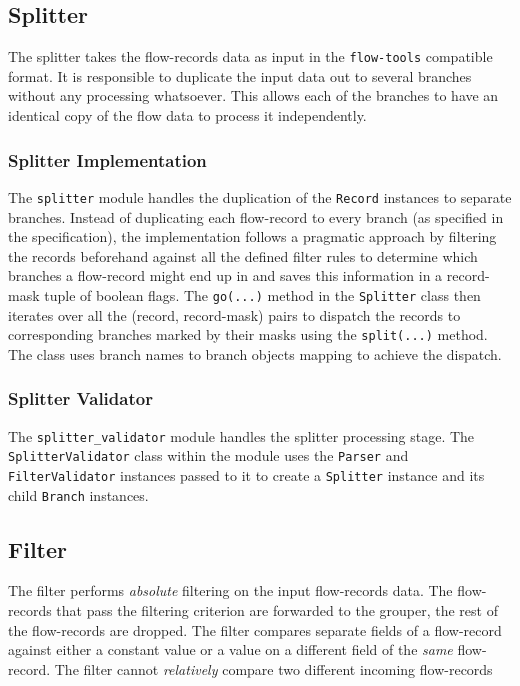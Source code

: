 \subsection{Splitter}\label{subsec:splitter}
The splitter takes the flow-records data as input in the \texttt{flow-tools} compatible format. It is responsible to duplicate the input data out to several branches without any processing whatsoever. This allows each of the branches to have an identical copy of the flow data to process it independently.

\subsubsection{Splitter Implementation}\label{subsubsec:splitter-impl}
The \texttt{splitter} module handles the duplication of the \texttt{Record} instances to separate branches. Instead of duplicating each flow-record to every branch (as specified in the specification), the implementation follows a pragmatic approach by filtering the records beforehand against all the defined filter rules to determine which branches a flow-record might end up in and saves this information in a record-mask tuple of boolean flags. The \texttt{go(...)} method in the \texttt{Splitter} class then iterates over all the (record, record-mask) pairs to dispatch the records to corresponding branches marked by their masks using the \texttt{split(...)} method. The class uses branch names to branch objects mapping to achieve the dispatch.

\subsubsection{Splitter Validator}\label{subsubsec:splitter-validator}
The \texttt{splitter\_validator} module handles the splitter processing stage.
The \texttt{SplitterValidator} class within the module uses the \texttt{Parser} and \texttt{FilterValidator} instances passed to it to create a \texttt{Splitter} instance and its child \texttt{Branch} instances.

\subsection{Filter}\label{subsec:filter}
The filter performs \emph{absolute} filtering on the input flow-records data. The flow-records that pass the filtering criterion are forwarded to the grouper, the rest of the flow-records are dropped. The filter compares separate fields of a flow-record against either a constant value or a value on a different field of the \emph{same} flow-record. The filter cannot \emph{relatively} compare two different incoming flow-records

